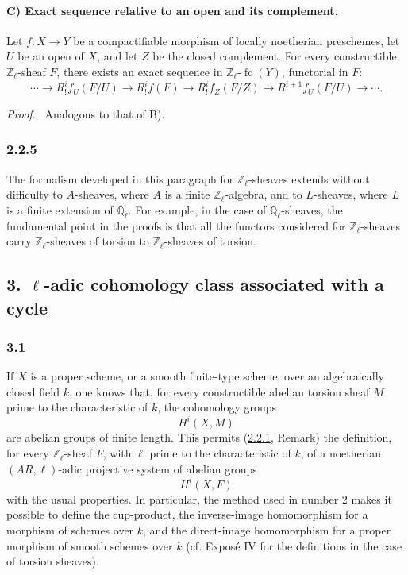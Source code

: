 \documentclass[11pt]{article}
\newenvironment{prooftext}[1][Proof]{\par\noindent\emph{#1.}\ }{\par\medskip}
\providecommand{\fc}{\operatorname{fc}}
\begin{document}
\paragraph{C) Exact sequence relative to an open and its complement.}
Let \(f:X\to Y\) be a compactifiable morphism of locally noetherian preschemes, let \(U\) be an open of \(X\), and let \(Z\) be the closed complement. For every constructible \(\mathbb Z_\ell\)-sheaf \(F\), there exists an exact sequence in \(\mathbb Z_\ell\text{-}\fc(Y)\), functorial in \(F\):
\[
\cdots\longrightarrow R^i_!f_U(F/U)
\longrightarrow R^i_!f(F)
\longrightarrow R^i_!f_Z(F/Z)
\longrightarrow R^{i+1}_!f_U(F/U)
\longrightarrow\cdots .
\]

\begin{prooftext}[Proof]
Analogous to that of B).
\end{prooftext}

\subsubsection*{2.2.5}\label{sga5:VI:subsubsection:2.2.5}
The formalism developed in this paragraph for \(\mathbb Z_\ell\)-sheaves extends without difficulty to \(A\)-sheaves, where \(A\) is a finite \(\mathbb Z_\ell\)-algebra, and to \(L\)-sheaves, where \(L\) is a finite extension of \(\mathbb Q_\ell\). For example, in the case of \(\mathbb Q_\ell\)-sheaves, the fundamental point in the proofs is that all the functors considered for \(\mathbb Z_\ell\)-sheaves carry \(\mathbb Z_\ell\)-sheaves of torsion to \(\mathbb Z_\ell\)-sheaves of torsion.

\subsection*{3. \(\ell\)-adic cohomology class associated with a cycle}\label{sga5:VI:subsection:3}

\subsubsection*{3.1}\label{sga5:VI:subsubsection:3.1}
If \(X\) is a proper scheme, or a smooth finite-type scheme, over an algebraically closed field \(k\), one knows that, for every constructible abelian torsion sheaf \(M\) prime to the characteristic of \(k\), the cohomology groups
\[
H^i(X,M)
\]
are abelian groups of finite length. This permits (\hyperref[sga5:VI:lemma:2.2.1]{2.2.1}, Remark) the definition, for every \(\mathbb Z_\ell\)-sheaf \(F\), with \(\ell\) prime to the characteristic of \(k\), of a noetherian \((AR,\ell)\)-adic projective system of abelian groups
\[
H^i(X,F)
\]
with the usual properties. In particular, the method used in number 2 makes it possible to define the cup-product, the inverse-image homomorphism for a morphism of schemes over \(k\), and the direct-image homomorphism for a proper morphism of smooth schemes over \(k\) (cf. Exposé IV for the definitions in the case of torsion sheaves).
\end{document}
